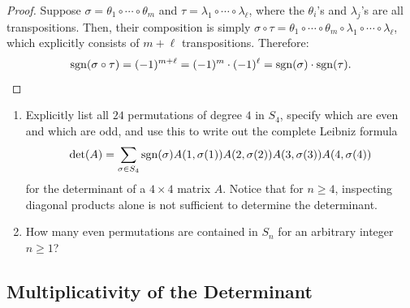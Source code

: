 \begin{proof}
  Suppose $\sigma = \theta_1 \circ \cdots \circ \theta_m$ and $\tau = \lambda_1 \circ \cdots \circ \lambda_{\ell}$, where the $\theta_i$'s and $\lambda_j$'s are all transpositions. Then, their composition is simply $\sigma \circ \tau = \theta_1 \circ \cdots \circ \theta_m \circ \lambda_1 \circ \cdots \circ \lambda_{\ell}$, which explicitly consists of $m + \ell$ transpositions. Therefore:
  \[
  \operatorname{sgn}(\sigma \circ \tau) = (-1)^{m+\ell} = (-1)^m \cdot (-1)^{\ell} = \operatorname{sgn}(\sigma) \cdot \operatorname{sgn}(\tau).
  \]
\end{proof}

\begin{exercise}
  \label{exc:symmetric_group_s4_and_alternating}
  \leavevmode
  \begin{enumerate}[label=\textbf{(\alph*)}]
    \item Explicitly list all $24$ permutations of degree $4$ in $S_4$, specify which are even and which are odd, and use this to write out the complete Leibniz formula
    \[
    \det(A) = \sum_{\sigma \in S_4} \operatorname{sgn}(\sigma) A(1,\sigma(1)) A(2,\sigma(2)) A(3,\sigma(3)) A(4,\sigma(4))
    \]
    for the determinant of a $4 \times 4$ matrix $A$. Notice that for $n \ge 4$, inspecting diagonal products alone is not sufficient to determine the determinant.
    \item How many even permutations are contained in $S_n$ for an arbitrary integer $n \ge 1$?
  \end{enumerate}
\end{exercise}

\subsection{Multiplicativity of the Determinant}

